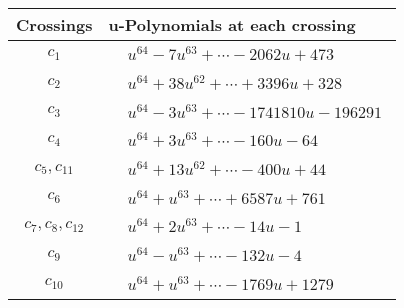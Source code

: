 \documentclass[1p]{elsarticle_modified}
\theoremstyle{definition}
\begin{document}
\begin{tabular}{m{50pt}|m{274pt}}
Crossings & \hspace{64pt}u-Polynomials at each crossing \\
\hline $$\begin{aligned}c_{1}\end{aligned}$$&$\begin{aligned}
&u^{64}-7 u^{63}+\cdots-2062 u+473
\end{aligned}$\\
\hline $$\begin{aligned}c_{2}\end{aligned}$$&$\begin{aligned}
&u^{64}+38 u^{62}+\cdots+3396 u+328
\end{aligned}$\\
\hline $$\begin{aligned}c_{3}\end{aligned}$$&$\begin{aligned}
&u^{64}-3 u^{63}+\cdots-1741810 u-196291
\end{aligned}$\\
\hline $$\begin{aligned}c_{4}\end{aligned}$$&$\begin{aligned}
&u^{64}+3 u^{63}+\cdots-160 u-64
\end{aligned}$\\
\hline $$\begin{aligned}c_{5},c_{11}\end{aligned}$$&$\begin{aligned}
&u^{64}+13 u^{62}+\cdots-400 u+44
\end{aligned}$\\
\hline $$\begin{aligned}c_{6}\end{aligned}$$&$\begin{aligned}
&u^{64}+u^{63}+\cdots+6587 u+761
\end{aligned}$\\
\hline $$\begin{aligned}c_{7},c_{8},c_{12}\end{aligned}$$&$\begin{aligned}
&u^{64}+2 u^{63}+\cdots-14 u-1
\end{aligned}$\\
\hline $$\begin{aligned}c_{9}\end{aligned}$$&$\begin{aligned}
&u^{64}- u^{63}+\cdots-132 u-4
\end{aligned}$\\
\hline $$\begin{aligned}c_{10}\end{aligned}$$&$\begin{aligned}
&u^{64}+u^{63}+\cdots-1769 u+1279
\end{aligned}$\\
\hline
\end{tabular}\\~\\
\end{document}
